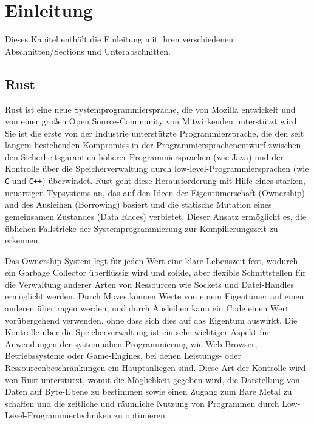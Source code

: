 
\chapter{Einleitung}

\nocite{*}

Dieses Kapitel enthält die Einleitung mit ihren verschiedenen Abschnitten/Sections und Unterabschnitten.

\section{Rust}

Rust ist eine neue Systemprogrammiersprache, die von Mozilla entwickelt und von einer großen Open Source-Community von Mitwirkenden unterstützt wird. Sie ist die erste von der Industrie unterstützte Programmiersprache, die den seit langem bestehenden Kompromiss in der Programmiersprachenentwurf zwischen den Sicherheitsgarantien höherer Programmiersprachen (wie Java) und der Kontrolle über die Speicherverwaltung durch low-level-Programmiersprachen (wie \texttt{C} und \texttt{C++}) überwindet. Rust geht diese Herausforderung mit Hilfe eines starken, neuartigen Typsystems an, das auf den Ideen der Eigentümerschaft (Ownership) and des Ausleihen (Borrowing) basiert und die statische Mutation eines gemeinsamen Zustandes (Data Races) verbietet. Dieser Ansatz ermöglicht es, die üblichen Fallstricke der Systemprogrammierung zur Kompilierungszeit zu erkennen.

Das Ownership-System legt für jeden Wert eine klare Lebenszeit fest, wodurch ein Garbage Collector überflüssig wird und solide, aber flexible Schnittstellen für die Verwaltung anderer Arten von Ressourcen wie Sockets und Datei-Handles ermöglicht werden. Durch \glqq Moves\grqq{} können Werte von einem Eigentümer auf einen anderen übertragen werden, und durch Ausleihen kann ein Code einen Wert vorübergehend verwenden, ohne dass sich dies auf das Eigentum auswirkt.
Die Kontrolle über die Speicherverwaltung ist ein sehr wichtiger Aspekt für Anwendungen der systemnahen Programmierung wie Web-Browser, Betriebssysteme oder Game-Engines, bei denen Leistungs- oder Ressourcenbeschränkungen ein Hauptanliegen sind. Diese Art der Kontrolle wird von Rust unterstützt, womit die Möglichkeit gegeben wird, die Darstellung von Daten auf Byte-Ebene zu bestimmen sowie einen Zugang zum \glqq Bare Metal\grqq{} zu schaffen und die zeitliche und räumliche Nutzung von Programmen durch Low-Level-Programmiertechniken zu optimieren.

